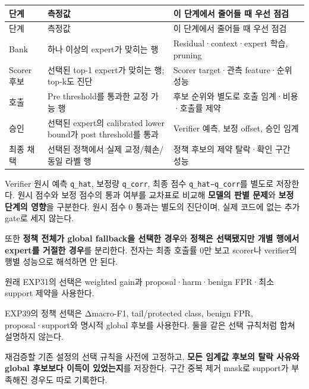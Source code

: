 \begingroup
\footnotesize
\begin{longtable}{>{\raggedright\arraybackslash}p{}>{\raggedright\arraybackslash}p{}>{\raggedright\arraybackslash}p{}}
\toprule
단계 & 측정값 & 이 단계에서 줄어들 때 우선 점검 \\ \midrule
\endfirsthead
단계 & 측정값 & 이 단계에서 줄어들 때 우선 점검 \\ \midrule
\endhead
{}Bank & 하나 이상의 expert가 맞히는 행 & Residual·context·expert 학습, pruning \\
{}Scorer 후보 & 선택된 top-1 expert가 맞히는 행; top-k도 진단 & Scorer target·관측 feature·순위 성능 \\
{}호출 & Pre threshold를 통과한 교정 가능 행 & 후보 순위와 별도로 호출 임계·비용·호출률 제약 \\
{}승인 & 선택된 expert의 calibrated lower bound가 post threshold를 통과 & Verifier 예측, 보정 offset, 승인 임계 \\
{}최종 채택 & 선택된 정책에서 실제 교정/\allowbreak{}훼손/\allowbreak{}동일 라벨 행 & 정책 후보의 제약 탈락·확인 구간 성능 \\
\bottomrule
\end{longtable}
\endgroup
Verifier 원시 예측 \texttt{q\_\allowbreak{}\allowbreak{}hat}, 보정량 \texttt{q\_\allowbreak{}\allowbreak{}corr}, 최종 점수 \texttt{q\_\allowbreak{}\allowbreak{}hat−q\_\allowbreak{}\allowbreak{}corr}를 별도로 저장한다. 원시 점수와 보정 점수의 통과 여부를 교차표로 비교해 \textbf{모델의 판별 문제}와 \textbf{보정 단계의 영향}을 구분한다. 원시 점수 0 통과는 별도의 진단이며, 실제 코드에 없는 추가 gate로 세지 않는다.

또한 \textbf{정책 전체가 global fallback을 선택한 경우}와 \textbf{정책은 선택됐지만 개별 행에서 expert를 거절한 경우}를 분리한다. 전자는 최종 호출률 0만 보고 scorer나 verifier의 행별 성능으로 해석하면 안 된다.

\par\noindent \textbullet\enspace 원래 EXP31의 선택은 weighted gain과 proposal·harm·benign FPR·최소 support 제약을 사용한다.


\par\noindent \textbullet\enspace EXP39의 정책 선택은 Δmacro-F1, tail/\allowbreak{}protected class, benign FPR, proposal·support와 명시적 global 후보를 사용한다. 둘을 같은 선택 규칙처럼 합쳐 설명하지 않는다.


\par\noindent \textbullet\enspace 재검증할 기존 설정의 선택 규칙을 사전에 고정하고, \textbf{모든 임계값 후보의 탈락 사유와 global 후보보다 이득이 있었는지}를 저장한다. 구간 중복 제거 mask로 support가 부족해진 경우도 따로 기록한다.


